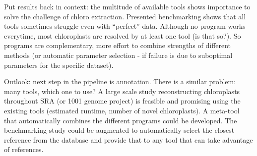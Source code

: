 \documentclass{bmcart}
\begin{document}
Put results back in context: the multitude of available tools shows importance to solve the challenge of chloro extraction. Presented benchmarking shows that all tools sometimes struggle even with ``perfect'' data. Although no program works everytime, most chloroplasts are resolved by at least one tool (is that so?). So programs are complementary, more effort to combine strengths of different methods (or automatic parameter selection - if failure is due to suboptimal parameters for the specific dataset).

Outlook: next step in the pipeline is annotation. There is a similar problem: many tools, which one to use? 
A large scale study reconstructing chloroplasts throughout SRA (or \num{1001} genome project) is feasible and promising using the existing tools (estimated runtime, number of novel chloroplasts).
A meta-tool that automatically combines the different programs could be developed.
The benchmarking study could be augmented to automatically select the closest reference from the database and provide that to any tool that can take advantage of references.

\end{document}
